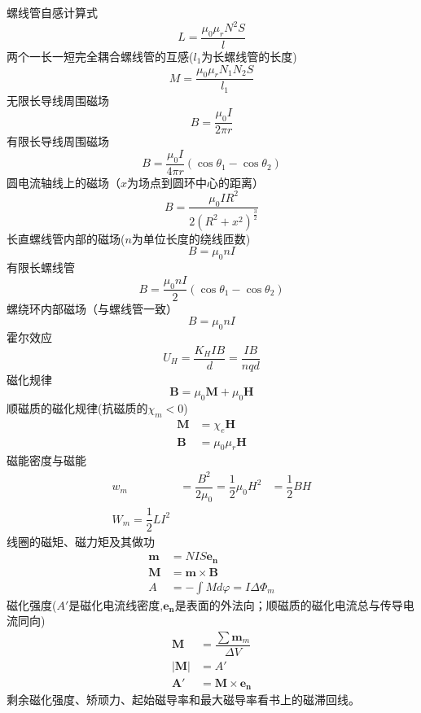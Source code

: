 螺线管自感计算式
\begin{equation}
    L=\dfrac{\mu_0\mu_rN^2S}{l}
\end{equation}
两个一长一短完全耦合螺线管的互感($l_1$为长螺线管的长度)
\begin{equation}
    M=\dfrac{\mu_0\mu_rN_1N_2S}{l_1}
\end{equation}
无限长导线周围磁场
\begin{equation}
    B=\dfrac{\mu_0I}{2\pi r}
\end{equation}
有限长导线周围磁场
\begin{equation}
    B=\dfrac{\mu_0I}{4\pi r}(\cos \theta_1-\cos \theta_2)
\end{equation}
圆电流轴线上的磁场（$x$为场点到圆环中心的距离）
\begin{equation}
    B=\dfrac{\mu_0 I R^2}{2(R^2+x^2)^{\frac{3}{2}}}
\end{equation}
长直螺线管内部的磁场($n$为单位长度的绕线匝数)
\begin{equation}
    B=\mu_0nI
\end{equation}
有限长螺线管
\begin{equation}
    B=\dfrac{\mu_0nI}{2}(\cos \theta_1-\cos \theta_2)
\end{equation}
螺绕环内部磁场（与螺线管一致）
\begin{equation}
    B=\mu_0nI
\end{equation}
霍尔效应
\begin{equation}
    U_H=\dfrac{K_HIB}{d}=\dfrac{IB}{nqd}
\end{equation}
磁化规律
\begin{equation}
    \bm{B}=\mu_0\bm{M}+\mu_0\bm{H}
\end{equation}
顺磁质的磁化规律(抗磁质的$\chi_m<0$)
\begin{align}
    \bm{M}&=\chi_e\bm{H}\\
    \bm{B}&=\mu_0\mu_r\bm{H}
\end{align}
磁能密度与磁能
\begin{align}
    w_m&=\dfrac{B^2}{2\mu_0}=\dfrac{1}{2}\mu_0 H^2&=\dfrac{1}{2}BH\\
    W_m=\dfrac{1}{2}LI^2
\end{align}
线圈的磁矩、磁力矩及其做功
\begin{align}
    \bm{m}&=NIS\bm{e_n}\\
    \bm{M}&=\bm{m}\times \bm{B}\\
    A&=-\int M d\varphi =I\Delta \varPhi_m
\end{align}
磁化强度($A'$是磁化电流线密度,$\bm{e_n}$是表面的外法向；顺磁质的磁化电流总与传导电流同向)
\begin{align}
    \bm{M}&=\dfrac{\sum \bm{m}_m}{\Delta V}\\
    |\bm{M}|&=A'\\
    \bm{A'}&=\bm{M}\times \bm{e_n}
\end{align}
剩余磁化强度、矫顽力、起始磁导率和最大磁导率看书上的磁滞回线。
